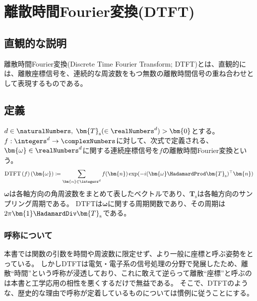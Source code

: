 	\chapter{離散時間Fourier変換(DTFT)}
		\newcommand{\DTFT}[1]{\mathrm{DTFT}\left(#1\right)}
		\newcommand{\DTFTwithArg}[2]{\DTFT{#1}\left(#2\right)}
		\newcommand{\IDTFT}[1]{\mathrm{IDTFT}\left(#1\right)}
		\newcommand{\IDTFTwithArg}[2]{\IDTFT{#1}\left(#2\right)}

		\section{直観的な説明}
			離散時間Fourier変換(Discrete Time Fourier Transform; DTFT)とは、直観的には、離散座標信号を、連続的な周波数をもつ無数の離散時間信号の重ね合わせとして表現するものである。
		\section{定義}
			$d\in\naturalNumbers,\;\bm{T}_\text{s}(\in\realNumbers^d)>\bm{0}$とする。
			$f:\integers^d\to\complexNumbers$に対して、次式で定義される、$\bm{\omega}\in\realNumbers^d$に関する連続座標信号を$f$の離散時間Fourier変換という。
			\[ \DTFTwithArg{f}{\bm{\omega}} \coloneqq \sum_{\bm{n}\in\integers^d} f(\bm{n})\exp(-i(\bm{\omega}\HadamardProd\bm{T}_\text{s})^\top\bm{n}) \]
			$\bm{\omega}$は各軸方向の角周波数をまとめて表したベクトルであり、$\bm{T}_\text{s}$は各軸方向のサンプリング周期である。
			DTFTは$\bm{\omega}$に関する周期関数であり、その周期は$2\pi\bm{1}\HadamardDiv\bm{T}_\text{s}$である。
			\subsection{呼称について}
				本書では関数の引数を時間や周波数に限定せず、より一般に座標と呼ぶ姿勢をとっている。
				しかしDTFTは電気・電子系の信号処理の分野で発展したため、離散``時間''という呼称が浸透しており、これに敢えて逆らって離散``座標''と呼ぶのは本書と工学応用の相性を悪くするだけで無益である。
				そこで、DTFTのような、歴史的な理由で呼称が定着しているものについては慣例に従うことにする。
